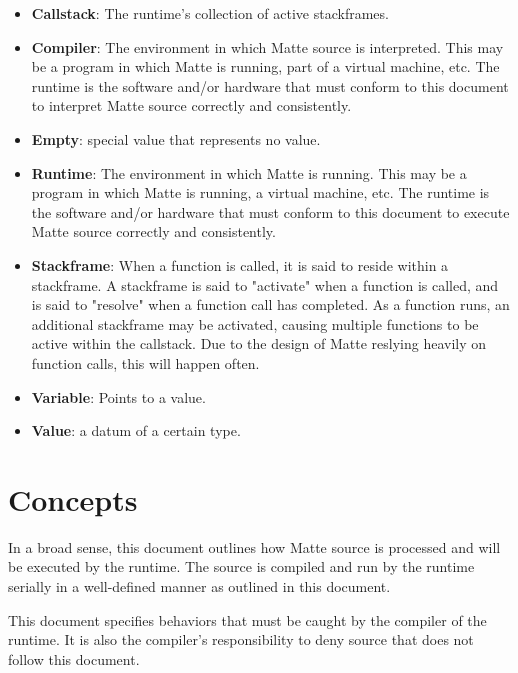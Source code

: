 \documentclass[12pt,letterpaper]{report}
\begin{document}
\begin{itemize}

\item \textbf{Callstack}: The runtime's collection of active stackframes.

\item \textbf{Compiler}: The environment in which Matte source is interpreted. This may be a program in which Matte is running, part of a virtual machine, etc. The runtime is the software and/or hardware that must conform to this document to interpret Matte source correctly and consistently.

\item \textbf{Empty}: special value that represents no value. 

\item \textbf{Runtime}: The environment in which Matte is running. This may be a program in which Matte is running, a virtual machine, etc. The runtime is the software and/or hardware that must conform to this document to execute Matte source correctly and consistently.

\item \textbf{Stackframe}: When a function is called, it is said to reside within a stackframe. A stackframe is said to "activate" when a function is called, and is said to "resolve" when a function call has completed. As a function runs, an additional stackframe may be activated, causing multiple functions to be active within the callstack. Due to the design of Matte reslying heavily on function calls, this will happen often.


\item \textbf{Variable}: Points to a value.

\item \textbf{Value}: a datum of a certain type.
\end{itemize}

\section{Concepts}\label{Concepts}

In a broad sense, this document outlines how Matte source is processed and will be 
executed by the runtime. The source is compiled and run by the runtime serially 
in a well-defined manner as outlined in this document. 

This document specifies behaviors that must be caught by the compiler of the 
runtime. It is also the compiler's responsibility to deny source that does not 
follow this document.
\end{document}

